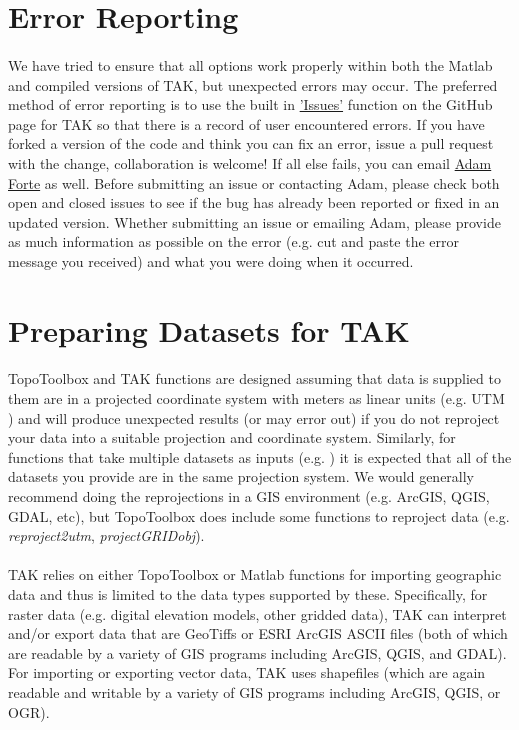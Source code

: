 \section{Error Reporting}
\paragraph{}We have tried to ensure that all options work properly within both the Matlab and compiled versions of TAK, but unexpected errors may occur. The preferred method of error reporting is to use the built in \href{https://github.com/amforte/Topographic-Analysis-Kit/issues}{'Issues'} function on the GitHub page for TAK so that there is a record of user encountered errors. If you have forked a version of the code and think you can fix an error, issue a pull request with the change, collaboration is welcome! If all else fails, you can email \href{mailto:aforte8@lsu.edu}{Adam Forte} as well. Before submitting an issue or contacting Adam, please check both open and closed issues to see if the bug has already been reported or fixed in an updated version. Whether submitting an issue or emailing Adam, please provide as much information as possible on the error (e.g. cut and paste the error message you received) and what you were doing when it occurred.

\section{Preparing Datasets for TAK} \label{sec:exmpl}
\paragraph{}TopoToolbox and TAK functions are designed assuming that data is supplied to them are in a projected coordinate system with meters as linear units (e.g. UTM ) and will produce unexpected results (or may error out) if you do not reproject your data into a suitable projection and coordinate system. Similarly, for functions that take multiple datasets as inputs (e.g. ) it is expected that all of the datasets you provide are in the same projection system. We would generally recommend doing the reprojections in a GIS environment (e.g. ArcGIS, QGIS, GDAL, etc), but TopoToolbox does include some functions to reproject data (e.g. \textit{reproject2utm}, \textit{projectGRIDobj}).

\paragraph{}TAK relies on either TopoToolbox or Matlab functions for importing geographic data and thus is limited to the data types supported by these. Specifically, for raster data (e.g. digital elevation models, other gridded data), TAK can interpret and/or export data that are GeoTiffs or ESRI ArcGIS ASCII files (both of which are readable by a variety of GIS programs including ArcGIS, QGIS, and GDAL). For importing or exporting vector data, TAK uses shapefiles (which are again readable and writable by a variety of GIS programs including ArcGIS, QGIS, or OGR).

